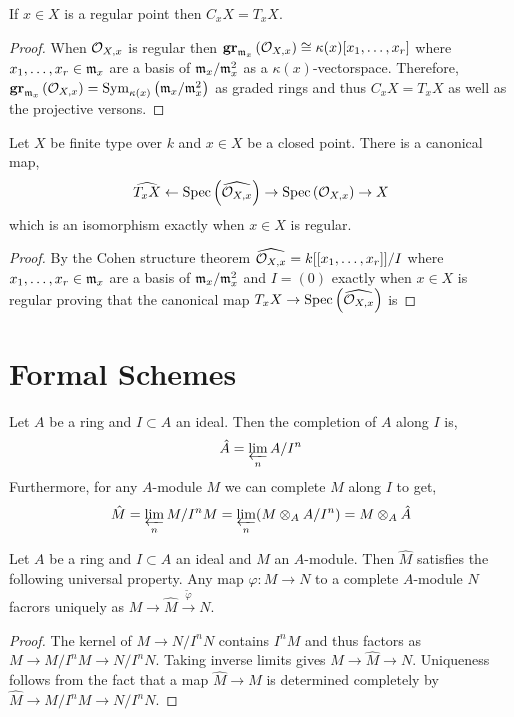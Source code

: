 \documentclass[12pt]{article}
\begin{document}
\begin{prop}
If $x \in X$ is a regular point then $C_x X = T_x X$. 
\end{prop}

\begin{proof}
When $\mathcal{O}_{X, x}$ is regular then $\mathbf{gr}_{\mathfrak{m}_x}\left(\mathcal{O}_{X, x}\right) \cong \kappa(x)[x_1, \dots, x_r]$ where $x_1, \dots, x_r \in \mathfrak{m}_x$ are a basis of $\mathfrak{m}_x / \mathfrak{m}_x^2$ as a $\kappa(x)$-vectorspace. Therefore, $\mathbf{gr}_{\mathfrak{m}_x}\left(\mathcal{O}_{X, x}\right) = \mathrm{Sym}_{\kappa(x)}\left( \mathfrak{m}_x / \mathfrak{m}_x^2 \right)$ as graded rings and thus $C_x X = T_x X$ as well as the projective versons.
\end{proof}

\begin{prop}
Let $X$ be finite type over $k$ and $x \in X$ be a closed point. There is a canonical map,
\[ \widehat{T_x X} \leftarrow \mathrm{Spec}\left( \widehat{\mathcal{O}_{X, x}} \right) \to \mathrm{Spec}\left( \mathcal{O}_{X, x} \right) \to X \]
which is an isomorphism exactly when $x \in X$ is regular.
\end{prop}

\begin{proof}
By the Cohen structure theorem $\widehat{\mathcal{O}_{X, x}} = k[[x_1, \dots, x_r]] / I$ where $x_1, \dots, x_r \in \mathfrak{m}_x$ are a basis of $\mathfrak{m}_x / \mathfrak{m}_x^2$ and $I = (0)$ exactly when $x \in X$ is regular proving that the canonical map $T_x X \to \mathrm{Spec}\left( \widehat{\mathcal{O}_{X, x}} \right)$ is 
\end{proof}

\section{Formal Schemes}

\begin{defn}
Let $A$ be a ring and $I \subset A$ an ideal. Then the completion of $A$ along $I$ is,
\[ \hat{A} = \varprojlim_{n} A / I^n \]
Furthermore, for any $A$-module $M$ we can complete $M$ along $I$ to get,
\[ \hat{M} = \varprojlim_{n} M / I^n M = \varprojlim_{n}( M \otimes_A A / I^n) = M \otimes_A \hat{A} \]
\end{defn}

\begin{prop}
Let $A$ be a ring and $I \subset A$ an ideal and $M$ an $A$-module. Then $\hat{M}$ satisfies the following universal property. Any map $\varphi : M \to N$ to a complete $A$-module $N$ facrors uniquely as $M \to \hat{M} \xrightarrow{\tilde{\varphi}} N$. 
\end{prop}

\begin{proof}
The kernel of $M \to N/I^n N$ contains $I^n M$ and thus factors as $M \to M / I^n M \to N / I^n N$. Taking inverse limits gives $M \to \hat{M} \to N$. Uniqueness follows from the fact that a map $\hat{M} \to M$ is determined completely by $\hat{M} \to M / I^n M \to N / I^n N$. 
\end{proof}
\end{document}
